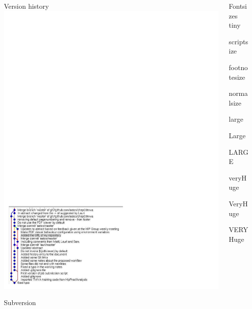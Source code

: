 \documentclass[final,hyperref={pdfpagelabels=false},notitlepage=true]{beamer}
\begin{document}
\begin{frame}{}
\begin{columns}[t]
\begin{column}{0.45\linewidth}
    \begin{block}{\large Version history}
      \includegraphics[scale=1.0]{history.pdf}
    \end{block}

    \begin{block}{\large Subversion}

    \end{block}

    \end{column}
      \begin{column}{0.45\linewidth}
    \begin{block}{\large Fontsizes}
      \centering
      {\tiny tiny}\par
      {\scriptsize scriptsize}\par
      {\footnotesize footnotesize}\par
      {\normalsize normalsize}\par
      {\large large}\par
      {\Large Large}\par
      {\LARGE LARGE}\par
      {\veryHuge veryHuge}\par
      {\VeryHuge VeryHuge}\par
      {\VERYHuge VERYHuge}\par
    \end{block}
    \vfill
    \end{column}
    \end{columns}
  \end{frame}
\end{document}
